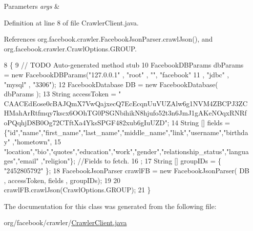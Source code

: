 \begin{DoxyParams}{Parameters}
{\em args} & \\
\hline
\end{DoxyParams}


Definition at line 8 of file Crawler\-Client.\-java.



References org.\-facebook.\-crawler.\-Facebook\-Json\-Parser.\-crawl\-Json(), and org.\-facebook.\-crawler.\-Crawl\-Options.\-G\-R\-O\-U\-P.


\begin{DoxyCode}
8                                                            \{
9         \textcolor{comment}{// TODO Auto-generated method stub}
10         FacebookDBParams dbParams = \textcolor{keyword}{new} FacebookDBParams(\textcolor{stringliteral}{"127.0.0.1"} , \textcolor{stringliteral}{"root"} , \textcolor{stringliteral}{""}, \textcolor{stringliteral}{"facebook"}
11                                     , \textcolor{stringliteral}{"jdbc"} , \textcolor{stringliteral}{"mysql"} , \textcolor{stringliteral}{"3306"});
12         FacebookDatabase DB = \textcolor{keyword}{new} FacebookDatabase( dbParams );
13         String accessToken = \textcolor{stringliteral}{"
      CAACEdEose0cBAJQmX7VwQajxecQ7EcEcqnUuVUZAlw6g1NVM4ZBCPJ3ZCHMahArRtfmqy7kscx6OOhTG0PSGNbihikN8hjufo52t3n6JmJ1gAKeNOqxRNRfoPQqhjD8B0Og72CTftXa4YksSPGF482xub6gIuUZD"};
14         String [] fields = \{\textcolor{stringliteral}{"id"},\textcolor{stringliteral}{"name"},\textcolor{stringliteral}{"first\_name"},\textcolor{stringliteral}{"last\_name"},\textcolor{stringliteral}{"middle\_name"},\textcolor{stringliteral}{"link"},\textcolor{stringliteral}{"username"},\textcolor{stringliteral}{"birthday"}
      ,\textcolor{stringliteral}{"hometown"},
15             \textcolor{stringliteral}{"location"},\textcolor{stringliteral}{"bio"},\textcolor{stringliteral}{"quotes"},\textcolor{stringliteral}{"education"},\textcolor{stringliteral}{"work"},\textcolor{stringliteral}{"gender"},\textcolor{stringliteral}{"relationship\_status"},\textcolor{stringliteral}{"languages"},\textcolor{stringliteral}{"email"}
      ,\textcolor{stringliteral}{"religion"}\}; \textcolor{comment}{//Fields to fetch.}
16             ;
17         String [] groupIDs = \{ \textcolor{stringliteral}{"2452805792"} \};
18         FacebookJsonParser crawlFB = \textcolor{keyword}{new} FacebookJsonParser( DB , accessToken, fields , groupIDs);
19         
20         crawlFB.crawlJson(CrawlOptions.GROUP);
21     \}
\end{DoxyCode}


The documentation for this class was generated from the following file\-:\begin{DoxyCompactItemize}
\item 
org/facebook/crawler/\hyperlink{_crawler_client_8java}{Crawler\-Client.\-java}\end{DoxyCompactItemize}
